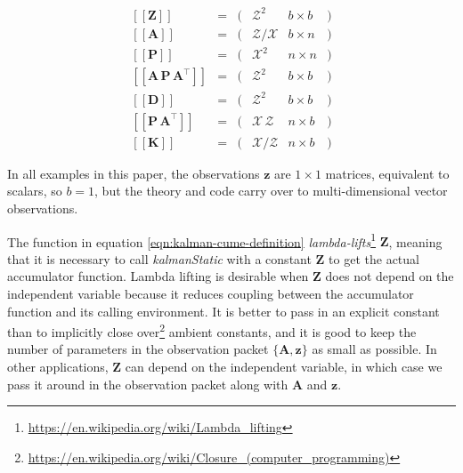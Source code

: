 \documentclass[10pt,oneside,x11names]{article}
\begin{document}
\begin{equation}
\label{eqn:dimensional-breakdown}
\begin{array}{lccccr}
\left[\left[\mathbold{Z}\right]\right]                                       &=& (&\mathcal{Z}^2            & b\times{b}&) \\
\left[\left[\mathbold{A}\right]\right]                                       &=& (&\mathcal{Z}/\mathcal{X}  & b\times{n}&) \\
\left[\left[\mathbold{P}\right]\right]                                       &=& (&\mathcal{X}^2            & n\times{n}&) \\
\left[\left[\mathbold{A}\,\mathbold{P}\,\mathbold{A}^\intercal\right]\right] &=& (&\mathcal{Z}^2            & b\times{b}&) \\
\left[\left[\mathbold{D}\right]\right]                                       &=& (&\mathcal{Z}^2            & b\times{b}&) \\
\left[\left[\mathbold{P}\,\mathbold{A}^\intercal\right]\right]               &=& (&\mathcal{X}\,\mathcal{Z} & n\times{b}&) \\
\left[\left[\mathbold{K}\right]\right]                                       &=& (&\mathcal{X}/\mathcal{Z}  & n\times{b}&)
\end{array}
\end{equation}

\noindent In all examples in this paper, the observations \(\mathbold{z}\) are
\(1\times{1}\) matrices, equivalent to scalars, so \(b=1\), but the theory and code
carry over to multi-dimensional vector observations.

The function in equation \ref{eqn:kalman-cume-definition}
\emph{lambda-lifts}\footnote{\url{https://en.wikipedia.org/wiki/Lambda\_lifting}} \(\mathbold{Z}\), meaning that it is necessary to call
\emph{kalmanStatic} with a constant \(\mathbold{Z}\) to get the actual accumulator
function. Lambda lifting is desirable when \(\mathbold{Z}\) does not depend on
the independent variable because it reduces coupling between the
accumulator function and its calling environment. It is better to pass in an
explicit constant than to implicitly close over\footnote{\url{https://en.wikipedia.org/wiki/Closure\_(computer\_programming)}} ambient
constants, and it is good to keep the number of parameters in the observation
packet \(\{\mathbold{A}, \mathbold{z}\}\) as small as possible. In other
applications, \(\mathbold{Z}\) can depend on the independent variable, in which
case we pass it around in the observation packet along with \(\mathbold{A}\) and
\(\mathbold{z}\).
\end{document}
